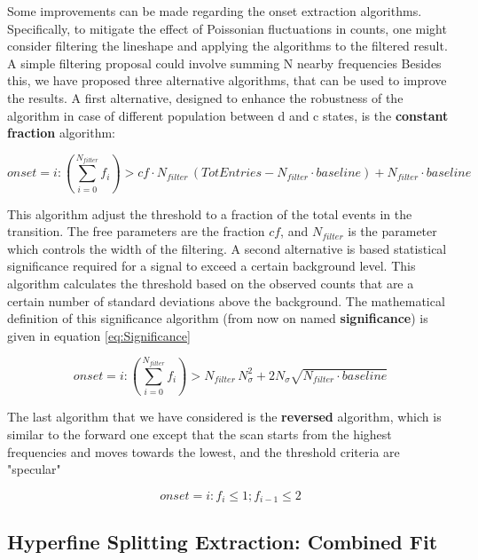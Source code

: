\documentclass[11pt,a4paper,oneside]{article}
\begin{document}
Some improvements can be made regarding the onset extraction algorithms. Specifically, to mitigate the effect of Poissonian fluctuations in counts, one might consider filtering the lineshape and applying the algorithms to the filtered result. A simple filtering proposal could involve summing N nearby frequencies
Besides this, we have proposed three alternative algorithms, that can be used to improve the results. A first alternative, designed to enhance the robustness of the algorithm in case of different population between d and c states, is the \textbf{constant fraction} algorithm:

\begin{equation}
onset = i : \left(\sum_{i = 0}^{N_{filter}} f_i \right) > cf \cdot N_{filter} \,( TotEntries - N_{filter} \cdot baseline) + N_{filter} \cdot baseline  
\end{equation}

This algorithm adjust the threshold to a fraction of the total events in the transition. The free parameters are the fraction $cf$, and $N_{filter}$ is the parameter which controls the width of the filtering.
A second alternative is based  statistical significance required for a signal to exceed a certain background level. 
This algorithm calculates the threshold based on the observed counts that are a certain number of standard deviations above the background. The mathematical definition of this significance algorithm (from now on named \textbf{significance}) is given in equation \ref{eq:Significance}

\begin{equation} \label{eq:Significance}
onset = i : \left( \sum_{i = 0}^{N_{filter}} f_i \right) > N_{filter} \, N_{\sigma}^{2} + 2 N_{\sigma} \sqrt{N_{filter} \cdot baseline} 
\end{equation}

The last algorithm that we have considered is the \textbf{reversed} algorithm, which is similar to the forward one except that the scan starts from the highest frequencies and moves towards the lowest, and the threshold criteria are "specular"

\begin{equation}
onset = i : f_i \leq 1; f_{i - 1} \leq 2 
\end{equation}

\subsection{Hyperfine Splitting Extraction: Combined Fit}
\end{document}
